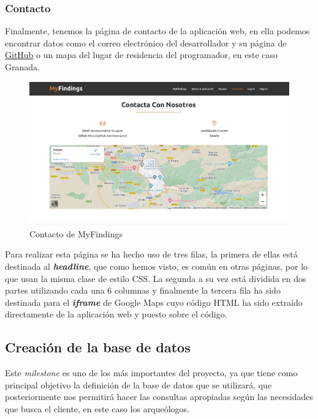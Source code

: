     \subsubsection{Contacto}
    Finalmente, tenemos la página de contacto de la aplicación web, en ella podemos
    encontrar datos como el correo electrónico del desarrollador y su página de
    \href{https://github.com/alexespana/}{GitHub} o un mapa del lugar de residencia del
    programador, en este caso Granada.\\

        \begin{figure}[H]
            \centering
            \includegraphics[scale=0.20]{imagenes/contact.png}
            \caption{Contacto de MyFindings}
            \label{fig:contact}
        \end{figure}

    Para realizar esta página se ha hecho uso de tres filas, la primera de ellas
    está destinada al \textbf{\textit{headline}}, que como hemos visto, es común en otras
    páginas, por lo que usan la misma clase de estilo CSS. La segunda a su vez está
    dividida en dos partes utilizando cada una 6 columnas y finalmente la tercera fila ha
    sido destinada para el \textbf{\textit{iframe}} de Google Maps cuyo código HTML ha sido
    extraído directamente de la aplicación web y puesto sobre el código.

\subsection{Creación de la base de datos}
Este \textit{milestone} es uno de los más importantes del proyecto, ya que tiene como
principal objetivo la definición de la base de datos que se utilizará, que posteriormente
nos permitirá hacer las consultas apropiadas según las necesidades que busca el cliente,
en este caso los arqueólogos.\\

